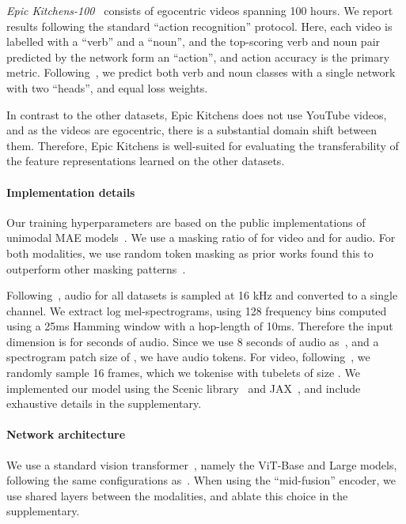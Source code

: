 \documentclass[10pt,twocolumn,letterpaper]{article}
\def \paravspace {-1\baselineskip}
\begin{document}
\noindent\quad\textit{Epic Kitchens-100}~\cite{damen2022rescaling} consists of  egocentric videos spanning 100 hours.
We report results following the standard ``action recognition'' protocol.
Here, each video is labelled with a ``verb'' and a ``noun'', and the top-scoring verb and noun pair predicted by the network form an ``action'', and action accuracy is the primary metric.
Following~\cite{arnab2021vivit, yan2022multiview, nagrani2021attention}, we predict both verb and noun classes with a single network with two ``heads'', and equal loss weights. 

In contrast to the other datasets, Epic Kitchens does not use YouTube videos, and as the videos are egocentric, there is a substantial domain shift between them.
Therefore, Epic Kitchens is well-suited for evaluating the transferability of the feature representations learned on the other datasets.



\vspace{\paravspace}
\paragraph{Implementation details}
Our training hyperparameters are based on the public implementations of unimodal MAE models~\cite{he2022masked, tong2022videomae}.
We use a masking ratio of  for video and  for audio.
For both modalities, we use random token masking as prior works found this to outperform other masking patterns~\cite{he2022masked, feichtenhofer2022masked, xu2022masked}.

Following~\cite{gong2021ast, nagrani2021attention}, audio for all datasets is sampled at 16 kHz and converted to a single channel. We extract log mel-spectrograms, using 128 frequency bins computed using a 25ms Hamming window with a hop-length of 10ms.
Therefore the input dimension is  for  seconds of audio.
Since we use 8 seconds of audio as~\cite{nagrani2021attention}, and a spectrogram patch size of , we have  audio tokens. For video, following~\cite{tong2022videomae, feichtenhofer2022masked}, we randomly sample 16 frames, which we tokenise with tubelets of size .
We implemented our model using the Scenic library~\cite{dehghani2021scenic} and JAX~\cite{jax2018github}, and include exhaustive details in the supplementary.

\vspace{\paravspace}
\paragraph{Network architecture}
We use a standard vision transformer~\cite{dosovitskiy_iclr_2021}, namely the ViT-Base and Large models, following the same configurations as~\cite{dosovitskiy_iclr_2021, devlin_naacl_2019}.
When using the ``mid-fusion'' encoder, we use  shared layers between the modalities, and ablate this choice in the supplementary.
\end{document}
